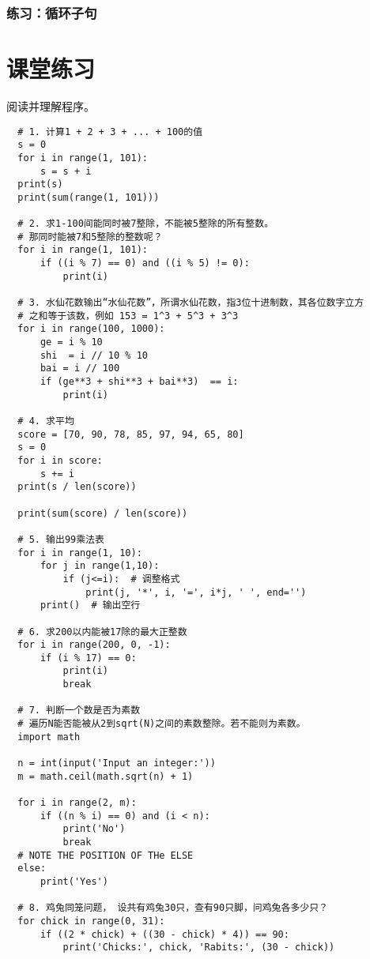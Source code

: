 \subsubsection{练习：循环子句}

\section{课堂练习}
阅读并理解程序。
\begin{framed}
\begin{verbatim}
  # 1. 计算1 + 2 + 3 + ... + 100的值
  s = 0
  for i in range(1, 101):
      s = s + i
  print(s)
  print(sum(range(1, 101)))

  # 2. 求1-100间能同时被7整除，不能被5整除的所有整数。
  # 那同时能被7和5整除的整数呢？
  for i in range(1, 101):
      if ((i % 7) == 0) and ((i % 5) != 0):
          print(i)

  # 3. 水仙花数输出“水仙花数”，所谓水仙花数，指3位十进制数，其各位数字立方
  # 之和等于该数，例如 153 = 1^3 + 5^3 + 3^3
  for i in range(100, 1000):
      ge = i % 10
      shi  = i // 10 % 10
      bai = i // 100
      if (ge**3 + shi**3 + bai**3)  == i:
          print(i)

  # 4. 求平均
  score = [70, 90, 78, 85, 97, 94, 65, 80]
  s = 0
  for i in score:
      s += i
  print(s / len(score))

  print(sum(score) / len(score))

  # 5. 输出99乘法表
  for i in range(1, 10):
      for j in range(1,10):
          if (j<=i):  # 调整格式
              print(j, '*', i, '=', i*j, ' ', end='')
      print()  # 输出空行

  # 6. 求200以内能被17除的最大正整数
  for i in range(200, 0, -1):
      if (i % 17) == 0:
          print(i)
          break

  # 7. 判断一个数是否为素数
  # 遍历N能否能被从2到sqrt(N)之间的素数整除。若不能则为素数。
  import math
  
  n = int(input('Input an integer:'))
  m = math.ceil(math.sqrt(n) + 1)

  for i in range(2, m):
      if ((n % i) == 0) and (i < n):
          print('No')
          break
  # NOTE THE POSITION OF THe ELSE
  else:  
      print('Yes')

  # 8. 鸡兔同笼问题， 设共有鸡兔30只，查有90只脚，问鸡兔各多少只？
  for chick in range(0, 31):
      if ((2 * chick) + ((30 - chick) * 4)) == 90:
          print('Chicks:', chick, 'Rabits:', (30 - chick))
\end{verbatim}
\end{framed}

